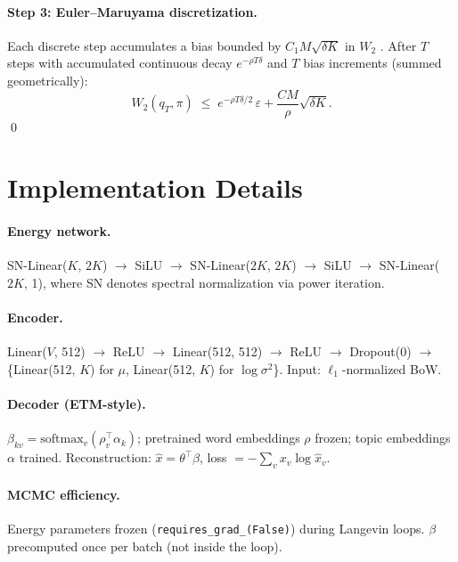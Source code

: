 \documentclass[10pt]{article}
\begin{document}
\paragraph{Step 3: Euler--Maruyama discretization.}
Each discrete step accumulates a bias bounded by $C_1 M\sqrt{\delta K}$ in $W_2$
\citep{dalalyan2017theoretical}. After $T$ steps with accumulated continuous
decay $e^{-\rho T\delta}$ and $T$ bias increments (summed geometrically):
\[
    W_2(q_T,\pi) \;\le\; e^{-\rho T\delta/2}\,\varepsilon + \frac{C M}{\rho}\sqrt{\delta K}.
\]
\qed

\section{Implementation Details}
\label{app:impl}

\paragraph{Energy network.}
SN-Linear($K$, $2K$) $\to$ SiLU $\to$ SN-Linear($2K$, $2K$) $\to$ SiLU $\to$ SN-Linear($2K$, 1),
where SN denotes spectral normalization via power iteration.

\paragraph{Encoder.}
Linear($V$, 512) $\to$ ReLU $\to$ Linear(512, 512) $\to$ ReLU $\to$ Dropout(0)
$\to$ \{Linear(512, $K$) for $\mu$, Linear(512, $K$) for $\log\sigma^2$\}.
Input: $\ell_1$-normalized BoW.

\paragraph{Decoder (ETM-style).}
$\beta_{kv} = \text{softmax}_v(\rho_v^\top \alpha_k)$; pretrained word embeddings
$\rho$ frozen; topic embeddings $\alpha$ trained.
Reconstruction: $\hat x = \theta^\top \beta$, loss $= -\sum_v x_v \log \hat x_v$.

\paragraph{MCMC efficiency.}
Energy parameters frozen (\texttt{requires\_grad\_(False)}) during Langevin loops.
$\beta$ precomputed once per batch (not inside the loop).
\end{document}
